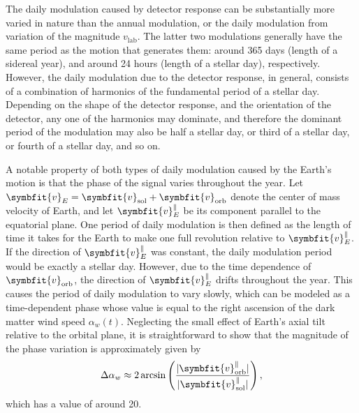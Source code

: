 \documentclass[b5paper, 10pt, twoside]{book}
\renewcommand{\vec}[1]{\symbfit{#1}}
\begin{document}
The daily modulation caused by detector response can be substantially more varied in nature than the annual modulation, or the daily modulation from variation of the magnitude $v_\text{lab}$. The latter two modulations generally have the same period as the motion that generates them: around 365 days (length of a sidereal year), and around 24 hours (length of a stellar day), respectively. However, the daily modulation due to the detector response, in general, consists of a combination of harmonics of the fundamental period of a stellar day. Depending on the shape of the detector response, and the orientation of the detector, any one of the harmonics may dominate, and therefore the dominant period of the modulation may also be half a stellar day, or third of a stellar day, or fourth of a stellar day, and so on.

A notable property of both types of daily modulation caused by the Earth's motion is that the phase of the signal varies throughout the year. Let $\vec{v}_E=\vec{v}_\text{sol}+\vec{v}_\text{orb}$ denote the center of mass velocity of Earth, and let $\vec{v}_E^\parallel$ be its component parallel to the equatorial plane. One period of daily modulation is then defined as the length of time it takes for the Earth to make one full revolution relative to $\vec{v}_E^\parallel$. If the direction of $\vec{v}_E^\parallel$ was constant, the daily modulation period would be exactly a stellar day. However, due to the time dependence of $\vec{v}_\text{orb}$, the direction of $\vec{v}_E^\parallel$ drifts throughout the year. This causes the period of daily modulation to vary slowly, which can be modeled as a time-dependent phase whose value is equal to the right ascension of the dark matter wind speed $\alpha_w(t)$. Neglecting the small effect of Earth's axial tilt relative to the orbital plane, it is straightforward to show that the magnitude of the phase variation is approximately given by
\begin{equation}
\Delta\alpha_w\approx 2\arcsin\left(\frac{|\vec{v}_\text{orb}^\parallel|}{|\vec{v}_\text{sol}^\parallel|}\right),
\end{equation}
which has a value of around 20\degree.
\end{document}
